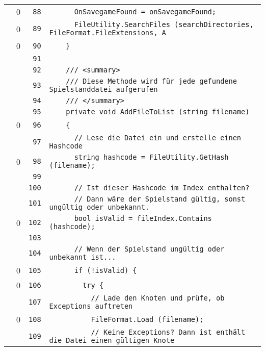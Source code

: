 \documentclass[a4paper,10pt]{article}
\begin{document}
\begin{longtable}[l]{lrrl}
\cellcolor{red} & 0 & \verb~88~ & \verb~      OnSavegameFound = onSavegameFound;~\\
\cellcolor{red} & 0 & \verb~89~ & \verb~      FileUtility.SearchFiles (searchDirectories, FileFormat.FileExtensions, A~\\
\cellcolor{red} & 0 & \verb~90~ & \verb~    }~\\
\cellcolor{gray} &  & \verb~91~ & \verb~~\\
\cellcolor{gray} &  & \verb~92~ & \verb~    /// <summary>~\\
\cellcolor{gray} &  & \verb~93~ & \verb~    /// Diese Methode wird für jede gefundene Spielstanddatei aufgerufen~\\
\cellcolor{gray} &  & \verb~94~ & \verb~    /// </summary>~\\
\cellcolor{gray} &  & \verb~95~ & \verb~    private void AddFileToList (string filename)~\\
\cellcolor{red} & 0 & \verb~96~ & \verb~    {~\\
\cellcolor{gray} &  & \verb~97~ & \verb~      // Lese die Datei ein und erstelle einen Hashcode~\\
\cellcolor{red} & 0 & \verb~98~ & \verb~      string hashcode = FileUtility.GetHash (filename);~\\
\cellcolor{gray} &  & \verb~99~ & \verb~~\\
\cellcolor{gray} &  & \verb~100~ & \verb~      // Ist dieser Hashcode im Index enthalten?~\\
\cellcolor{gray} &  & \verb~101~ & \verb~      // Dann wäre der Spielstand gültig, sonst ungültig oder unbekannt.~\\
\cellcolor{red} & 0 & \verb~102~ & \verb~      bool isValid = fileIndex.Contains (hashcode);~\\
\cellcolor{gray} &  & \verb~103~ & \verb~~\\
\cellcolor{gray} &  & \verb~104~ & \verb~      // Wenn der Spielstand ungültig oder unbekannt ist...~\\
\cellcolor{red} & 0 & \verb~105~ & \verb~      if (!isValid) {~\\
\cellcolor{red} & 0 & \verb~106~ & \verb~        try {~\\
\cellcolor{gray} &  & \verb~107~ & \verb~          // Lade den Knoten und prüfe, ob Exceptions auftreten~\\
\cellcolor{red} & 0 & \verb~108~ & \verb~          FileFormat.Load (filename);~\\
\cellcolor{gray} &  & \verb~109~ & \verb~          // Keine Exceptions? Dann ist enthält die Datei einen gültigen Knote~\\

\end{longtable}
\end{document}

